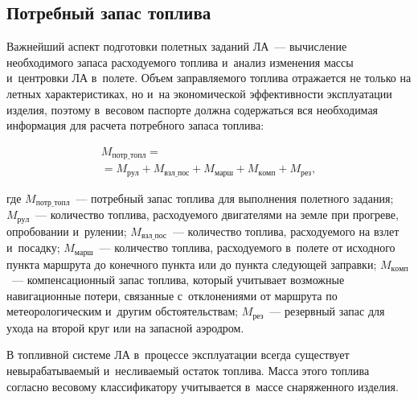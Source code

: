 \begin{multicols}{2}
\section{Потребный запас топлива }

\vspace*{-2pt}

  Важнейший аспект подготовки полетных заданий ЛА~--- вычисление 
необходимого запаса расходуемого топлива и~анализ изменения массы 
и~центровки ЛА в~полете. Объем заправляемого топлива 
отражается не только на летных характеристиках, но и~на экономической 
эффективности эксплуатации изделия, поэтому в~весовом паспорте должна 
содержаться вся необходимая информация для расчета потребного запаса 
топлива: 

\vspace*{-2pt}

\noindent
 \begin{multline*}
  M_{\mathrm{потр\_топл}} ={}\\
  {}= M_{\mathrm{рул}} + M_{\mathrm{взл\_пос}} + 
M_{\mathrm{марш}} + M_{\mathrm{комп}} + M_{\mathrm{рез}}, 
\end{multline*}

\vspace*{-2pt}

\noindent
  где $M_{\mathrm{потр\_топл}}$~--- потребный запас топлива для 
выполнения полетного задания;
  $M_{\mathrm{рул}}$~--- количество топлива, расходуемого двигателями на 
земле при прогреве, опробовании и~рулении;
  $M_{\mathrm{взл\_пос}}$~--- количество топлива, расходуемого на взлет 
и~посадку;
  $M_{\mathrm{марш}}$~--- количество топлива, расходуемого в~полете от 
исходного пункта маршрута до конечного пункта или до пункта следующей 
заправки;
  $M_{\mathrm{комп}}$~--- компенсационный запас топлива, который 
учитывает возможные навигационные потери, связанные с~отклонениями от 
маршрута по метеорологическим и~другим обстоятельствам;
  $M_{\mathrm{рез}}$~--- резервный запас для ухода на второй круг или на 
запасной аэродром.
  
  В топливной системе ЛА в~процессе эксплуатации всегда существует 
невырабатываемый и~несливаемый остаток топлива. Масса этого топлива 
согласно весовому классификатору учитывается в~массе снаряженного изделия. 

\begin{figure*} %
\vspace*{1pt}
    \begin{center}  
  \mbox{%
 \epsfxsize=163mm 
 }
\end{center}
\vspace*{-9pt}
\end{figure*}


\end{multicols}
